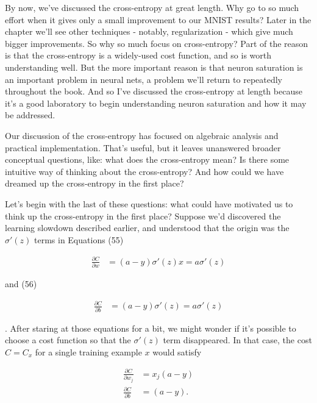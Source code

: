 By now, we've discussed the cross-entropy at great length. Why go to so much effort when it gives only a small improvement to our MNIST results? Later in the chapter we'll see other techniques - notably, regularization - which give much bigger improvements. So why so much focus on cross-entropy? Part of the reason is that the cross-entropy is a widely-used cost function, and so is worth understanding well. But the more important reason is that neuron saturation is an important problem in neural nets, a problem we'll return to repeatedly throughout the book. And so I've discussed the cross-entropy at length because it's a good laboratory to begin understanding neuron saturation and how it may be addressed.





Our discussion of the cross-entropy has focused on algebraic analysis and practical implementation. That's useful, but it leaves unanswered broader conceptual questions, like: what does the cross-entropy mean? Is there some intuitive way of thinking about the cross-entropy? And how could we have dreamed up the cross-entropy in the first place?


Let's begin with the last of these questions: what could have motivated us to think up the cross-entropy in the first place? Suppose we'd discovered the learning slowdown described earlier, and understood that the origin was the $\sigma'(z)$ terms in Equations (55)

\begin{align*}
\frac{\partial C}{\partial w} &= (a-y)\sigma'(z) x = a \sigma'(z) \nonumber
\end{align*}

\noindent and (56)

\begin{align*}
\frac{\partial C}{\partial b} &= (a-y)\sigma'(z) = a \sigma'(z) \nonumber
\end{align*}

\noindent. After staring at those equations for a bit, we might wonder if it's possible to choose a cost function so that the $\sigma'(z)$ term disappeared. In that case, the cost $C = C_x$ for a single training example $x$ would satisfy

\begin{align}
\frac{\partial C}{\partial w_j} &= x_j(a-y) \tag{71} \\ \frac{\partial C}{\partial b } &= (a-y). \tag{72}
\end{align}

